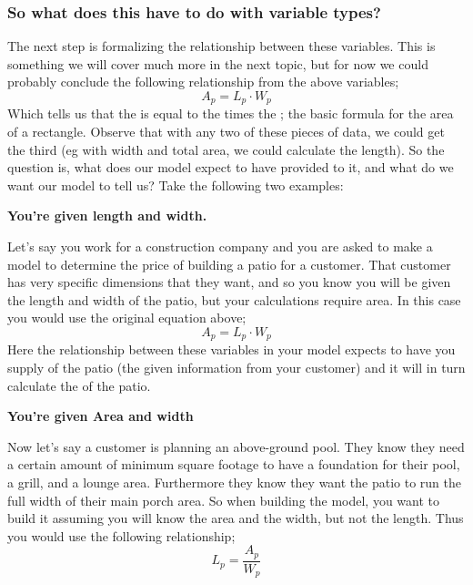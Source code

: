 \documentclass{ximera}
\begin{document}
\subsubsection*{So what does this have to do with variable types?}
    \begin{exploration}
        The next step is formalizing the relationship between these variables. This is something we will cover much more in the next topic, but for now we could probably conclude the following relationship from the above variables;
        \[
            A_p = L_p \cdot W_p
        \]
        Which tells us that the  is equal to the  times the ; the basic formula for the area of a rectangle. Observe that with any two of these pieces of data, we could get the third (eg with width and total area, we could calculate the length). So the question is, what does our model expect to have provided to it, and what do we want our model to tell us? Take the following two examples:
    \end{exploration}
    
    \begin{example}
        {\large\bfseries You're given length and width.}%
    
        Let's say you work for a construction company and you are asked to make a model to determine the price of building a patio for a customer. That customer has very specific dimensions that they want, and so you know you will be given the length and width of the patio, but your calculations require area. In this case you would use the original equation above;
        \[
            A_p = L_p \cdot W_p
        \]
        Here the relationship between these variables in your model expects to have you supply  of the patio (the given information from your customer) and it will in turn calculate the  of the patio.
        
        
        
        \begin{explanation}
            {\large\bfseries You're given Area and width}%
            
            Now let's say a customer is planning an above-ground pool. They know they need a certain amount of minimum square footage to have a foundation for their pool, a grill, and a lounge area. Furthermore they know they want the patio to run the full width of their main porch area. So when building the model, you want to build it assuming you will know the area and the width, but not the length. Thus you would use the following relationship;
            \[
                L_p = \frac{A_p}{W_p}
            \]
        \end{explanation}
    \end{example}
        
\end{document}
